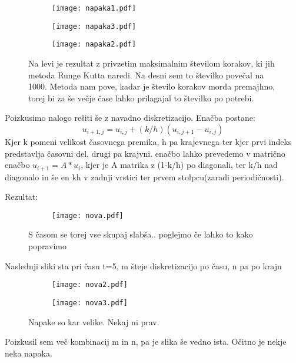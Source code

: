 \documentclass{article}
\begin{document}
\begin{figure}[H]
\centering
\begin{subfigure}{.5\textwidth}
\texttt{[image: napaka1.pdf]}
\end{subfigure}
\end{figure}


\begin{figure}[H]
\begin{subfigure}{.5\textwidth}
\texttt{[image: napaka3.pdf]}
\end{subfigure}
\begin{subfigure}{.5\textwidth}
\texttt{[image: napaka2.pdf]}
\end{subfigure}
\caption*{Na levi je rezultat z privzetim maksimalnim številom korakov, ki jih metoda Runge Kutta naredi. Na desni sem to številko povečal na 1000. Metoda nam pove, kadar je število korakov morda premajhno, torej bi za še večje čase lahko prilagajal to številko po potrebi.}
\end{figure}

\newpage
Poizkusimo nalogo rešiti še z navadno diskretizacijo.
Enačba postane:
\begin{equation*}
u_{i+1,j} = u_{i,j} + (k/h)(u_{i,j+1} - u_{i,j})
\end{equation*}
Kjer k pomeni velikost časovnega premika, h pa krajevnega ter kjer prvi indeks predstavlja časovni del, drugi pa krajvni.
enačbo lahko prevedemo v matrično enačbo $u_{i+1} = A * u_{i}$, kjer je A matrika z (1-k/h) po diagonali, ter k/h nad diagonalo in še en kh v zadnji vrstici ter prvem stolpcu(zaradi periodičnosti).

Rezultat:

\begin{figure}[H]
\centering
\begin{subfigure}{.5\textwidth}
\texttt{[image: nova.pdf]}
\end{subfigure}
\caption*{S časom se torej vse skupaj slabša.. poglejmo če lahko to kako popravimo}
\end{figure}

Naslednji sliki sta pri času t=5, m šteje diskretizacijo po času, n pa po kraju
\begin{figure}[H]
\begin{subfigure}{.5\textwidth}
\texttt{[image: nova2.pdf]}
\end{subfigure}
\begin{subfigure}{.5\textwidth}
\texttt{[image: nova3.pdf]}
\end{subfigure}
\caption*{Napake so kar velike. Nekaj ni prav.}
\end{figure}

Poizkusil sem več kombinacij m in n, pa je slika še vedno ista. Očitno je nekje neka napaka.
\end{document}
